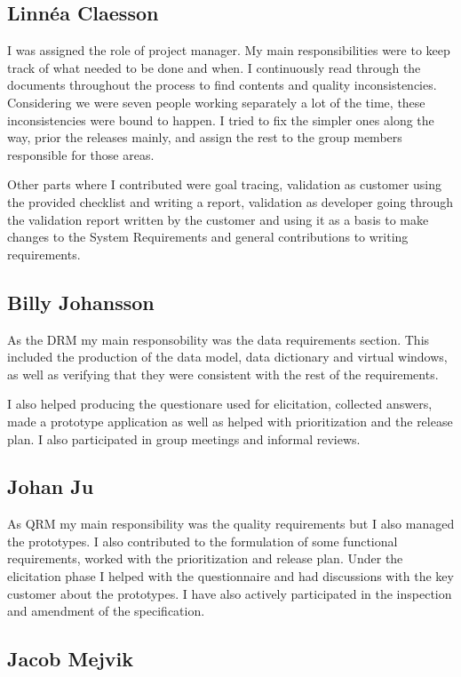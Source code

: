 \documentclass[10pt,a4paper]{article}
\begin{document}
\subsection{Linn\'ea Claesson}
I was assigned the role of project manager. My main responsibilities were to keep track of what needed to be done and when. I continuously read through the documents throughout the process to find contents and quality  inconsistencies. Considering we were seven people working separately a lot of the time, these inconsistencies were bound to happen. I tried to fix the simpler ones along the way, prior the releases mainly, and assign the rest to the group members responsible for those areas.

Other parts where I contributed were goal tracing, validation as customer using the provided checklist and writing a report, validation as developer going through the validation report written by the customer and using it as a basis to make changes to the System Requirements and general contributions to writing requirements.

\subsection{Billy Johansson}
As the DRM my main responsobility was the data requirements section. This included the production of the data model, data dictionary and virtual windows, as well as verifying that they were consistent with the rest of the requirements.

I also helped producing the questionare used for elicitation, collected answers, made a prototype application as well as helped with prioritization and the release plan. I also participated in group meetings and informal reviews. 

\subsection{Johan Ju}
As QRM my main responsibility was the quality requirements but I also managed the prototypes. I also contributed to the formulation of some functional requirements, worked with the prioritization and release plan. Under the elicitation phase I helped with the questionnaire and had discussions with the key customer about the prototypes. I have also actively participated in the inspection and amendment of the specification.

\subsection{Jacob Mejvik}
\end{document}
